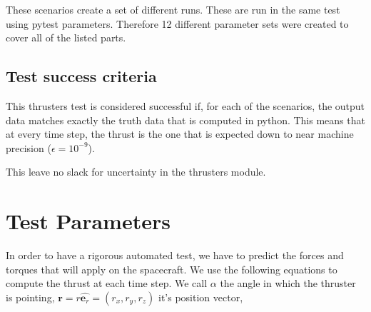 These scenarios create a set of different runs. These are run in the same test using pytest parameters. Therefore 12 different parameter sets were created to cover all of the listed parts.

\subsection{Test success criteria}

This thrusters test is considered successful if, for each of the scenarios, the output data matches exactly the truth data that is computed in python. This means that at every time step, the thrust is the one that is expected down to near machine precision ($\epsilon = 10^{-9}$). 

This leave no slack for uncertainty in the thrusters module.



\section{Test Parameters}


In order to have a rigorous automated test, we have to predict the forces and torques that will apply on the spacecraft. We use the following equations to compute the thrust at each time step. We call $\alpha$ the angle in which the thruster is pointing, $\bm r = r \hat{\bm e_r}= \left(r_x, r_y, r_z \right)$ it's position vector, 


